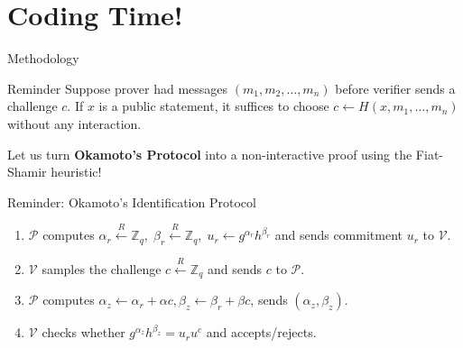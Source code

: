 \documentclass{zkdl-presentation-template}
\begin{document}
    \section{Coding Time!}

    \begin{frame}{Methodology}
        \begin{block}{Reminder}
            Suppose prover had messages $(m_1,m_2,\dots,m_n)$ before verifier sends a challenge $c$. If $x$ is a public statement, it suffices to choose $c \gets H(x,m_1,\dots,m_n)$ without any interaction.
        \end{block}
        \vspace{-10pt}

        Let us turn \textbf{Okamoto's Protocol} into a non-interactive proof using the Fiat-Shamir heuristic!

        \begin{block}{Reminder: Okamoto's Identification Protocol}
            \begin{enumerate}
                \item $\mathcal{P}$ computes $\alpha_r \xleftarrow{R} \mathbb{Z}_q, \; \beta_r \xleftarrow{R} \mathbb{Z}_q, \; u_r \gets g^{\alpha_r}h^{\beta_r}$ and sends commitment $u_r$ to $\mathcal{V}$.
                \item $\mathcal{V}$ samples the challenge $c \xleftarrow{R} \mathbb{Z}_q$ and sends $c$ to $\mathcal{P}$.
                \item $\mathcal{P}$ computes $\alpha_z \gets \alpha_r + \alpha c, \beta_z \gets \beta_r + \beta c$, sends $(\alpha_z,\beta_z)$.
                \item $\mathcal{V}$ checks whether $g^{\alpha_z}h^{\beta_z} = u_r u^c$ and accepts/rejects.
            \end{enumerate}
        \end{block}
    \end{frame}
\end{document}
